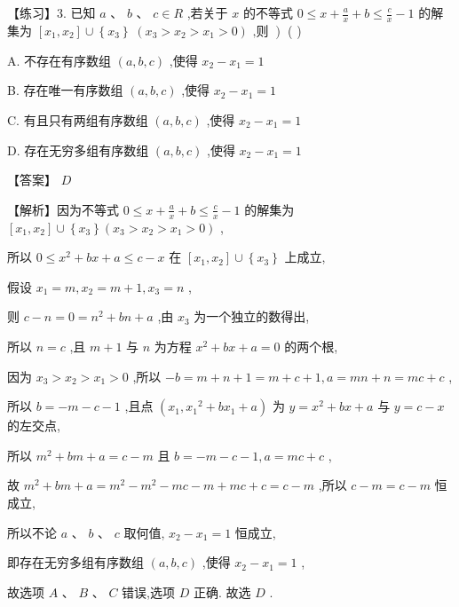 \documentclass[10pt]{article}
\begin{document}
【练习】3. 已知 \(a\text{ 、 }b\text{ 、 }c \in  R\) ,若关于 \(x\) 的不等式 \(0 \leq  x + \frac{a}{x} + b \leq  \frac{c}{x} - 1\) 的解集为 \(\left\lbrack  {{x}_{1},{x}_{2}}\right\rbrack   \cup  \left\{  {x}_{3}\right\} \; \left. {\left( {{x}_{3} > {x}_{2} > {x}_{1} > 0}\right) \text{ ,则 }}\right)\) ( )

A. 不存在有序数组 \(\left( {a,b,c}\right)\) ,使得 \({x}_{2} - {x}_{1} = 1\)

B. 存在唯一有序数组 \(\left( {a,b,c}\right)\) ,使得 \({x}_{2} - {x}_{1} = 1\)

C. 有且只有两组有序数组 \(\left( {a,b,c}\right)\) ,使得 \({x}_{2} - {x}_{1} = 1\)

D. 存在无穷多组有序数组 \(\left( {a,b,c}\right)\) ,使得 \({x}_{2} - {x}_{1} = 1\)

【答案】 \(D\)

【解析】因为不等式 \(0 \leq  x + \frac{a}{x} + b \leq  \frac{c}{x} - 1\) 的解集为 \(\left\lbrack  {{x}_{1},{x}_{2}}\right\rbrack   \cup  \left\{  {x}_{3}\right\}  \left( {{x}_{3} > {x}_{2} > {x}_{1} > 0}\right)\) ,

所以 \(0 \leq  {x}^{2} + {bx} + a \leq  c - x\) 在 \(\left\lbrack  {{x}_{1},{x}_{2}}\right\rbrack   \cup  \left\{  {x}_{3}\right\}\) 上成立,

假设 \({x}_{1} = m,{x}_{2} = m + 1,{x}_{3} = n\) ,

则 \(c - n = 0 = {n}^{2} + {bn} + a\) ,由 \({x}_{3}\) 为一个独立的数得出,

所以 \(n = c\) ,且 \(m + 1\) 与 \(n\) 为方程 \({x}^{2} + {bx} + a = 0\) 的两个根,

因为 \({x}_{3} > {x}_{2} > {x}_{1} > 0\) ,所以 \(- b = m + n + 1 = m + c + 1,a = {mn} + n = {mc} + c\) ,

所以 \(b =  - m - c - 1\) ,且点 \(\left( {{x}_{1},{x}_{1}{}^{2} + b{x}_{1} + a}\right)\) 为 \(y = {x}^{2} + {bx} + a\) 与 \(y = c - x\) 的左交点,

所以 \({m}^{2} + {bm} + a = c - m\) 且 \(b =  - m - c - 1,a = {mc} + c\) ,

故 \({m}^{2} + {bm} + a = {m}^{2} - {m}^{2} - {mc} - m + {mc} + c = c - m\) ,所以 \(c - m = c - m\) 恒成立,

所以不论 \(a\text{ 、 }b\text{ 、 }c\) 取何值, \({x}_{2} - {x}_{1} = 1\) 恒成立,

即存在无穷多组有序数组 \(\left( {a,b,c}\right)\) ,使得 \({x}_{2} - {x}_{1} = 1\) ,

故选项 \(A\text{ 、 }B\text{ 、 }C\) 错误,选项 \(D\) 正确. 故选 \(D\) .
\end{document}
